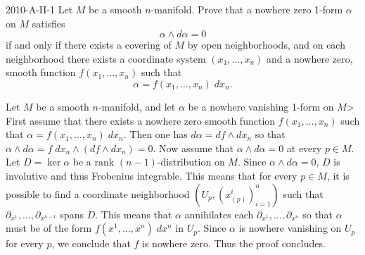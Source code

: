\documentclass{article}
\begin{document}
	
	\begin{prb}{2010-A-II-1}
		Let $M$ be a smooth $n$-manifold. Prove that a nowhere zero 1-form $\alpha$ on $M$ satisfies 
		\begin{equation*}
			\alpha \wedge d\alpha = 0 
		\end{equation*}
		if and only if there exists a covering of $M$ by open neighborhoods, and on each neighborhood there exists a coordinate system $(x_{1}, \ldots, x_{n})$ and a nowhere zero, smooth function $f(x_{1}, \ldots, x_{n})$ such that 
		\begin{equation*}
			\alpha = f(x_{1}, \ldots, x_{n})\;dx_{n}. 
		\end{equation*}
	\end{prb}
	Let $M$ be a smooth $n$-manifold, and let $\alpha$ be a nowhere vanishing 1-form on $M$> First assume that there exists a nowhere zero smooth function $f(x_{1}, \ldots, x_{n})$ such that $\alpha = f(x_{1}, \ldots, x_{n})\;dx_{n}$. Then one has $d\alpha = df \wedge dx_{n}$ so that $\alpha \wedge d\alpha = f\;dx_{n} \wedge (df \wedge dx_{n}) = 0$. Now assume that $\alpha \wedge d\alpha = 0$ at every $p \in M$. Let $D = \ker{\alpha}$ be a rank $(n-1)$-distribution on $M$. Since $\alpha \wedge d\alpha = 0$, $D$ is involutive and thus Frobenius integrable. This means that for every $p \in M$, it is possible to find a coordinate neighborhood $(U_{p}, (x^{i}_{(p)})_{i = 1}^{n})$ such that $\partial_{x^{1}}, \ldots, \partial_{x^{n-1}}$ spans $D$. This means that $\alpha$ annihilates each $\partial_{x^{1}}, \ldots, \partial_{x^{n}}$ so that $\alpha$ must be of the form $f(x^{1}, \ldots, x^{n})\;dx^{n}$ in $U_{p}$. Since $\alpha$ is nowhere vanishing on $U_{p}$ for every $p$, we conclude that $f$ is nowhere zero. Thus the proof concludes. 
	
\end{document}
